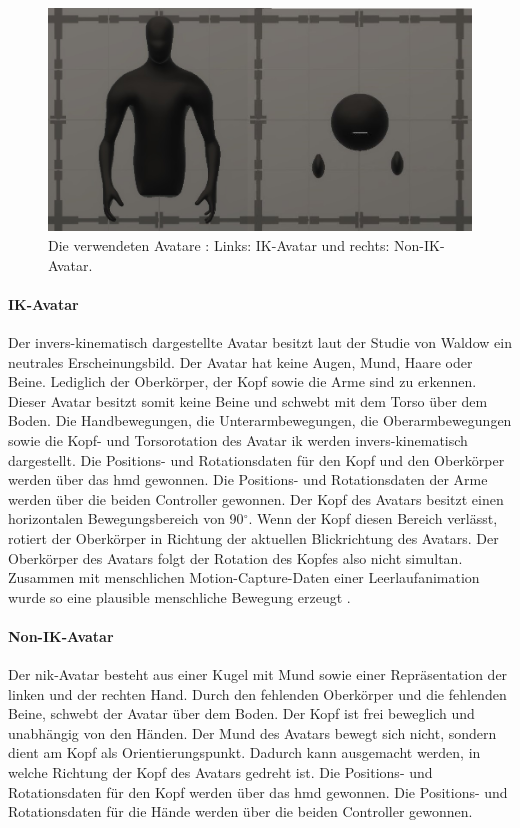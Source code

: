 \documentclass[a4paper,11pt]{article}%
\renewcommand{\\}{\vspace*{0.5\baselineskip} \newline}
\begin{document}
	\begin{figure}[H]
		\begin{footnotesize}
		\centering
			\includegraphics[width=\textwidth]{Abbildungen/Avatars.JPG}	
			\caption[Die verwendeten Avatare]{Die verwendeten Avatare : Links: IK-Avatar und rechts: Non-IK-Avatar.}
			\label{AvatareAussehen}
		\end{footnotesize}
	\end{figure}
	
		\paragraph{IK-Avatar}
Der invers-kinematisch dargestellte Avatar besitzt laut der Studie von Waldow \citep[S. 251]{waldow2019investigating} ein neutrales Erscheinungsbild. Der Avatar hat keine Augen, Mund, Haare oder Beine. Lediglich der Oberkörper, der Kopf sowie die Arme sind zu erkennen. Dieser Avatar besitzt somit keine Beine und schwebt mit dem Torso über dem Boden.
Die Handbewegungen, die Unterarmbewegungen, die Oberarmbewegungen sowie die Kopf- und Torsorotation des Avatar \ac{ik} werden invers-kinematisch dargestellt. Die Positions- und Rotationsdaten für den Kopf und den Oberkörper werden über das \ac{hmd} gewonnen. Die Positions- und Rotationsdaten der Arme werden über die beiden Controller gewonnen. Der Kopf des Avatars besitzt einen horizontalen Bewegungsbereich von 90$^\circ$. Wenn der Kopf diesen Bereich verlässt, rotiert der Oberkörper in Richtung der aktuellen Blickrichtung des Avatars. Der Oberkörper des Avatars folgt der Rotation des Kopfes also nicht simultan. Zusammen mit menschlichen Motion-Capture-Daten einer Leerlaufanimation wurde so eine plausible menschliche Bewegung erzeugt \citep[S. 251]{waldow2019investigating}.

		\paragraph{Non-IK-Avatar}
Der \ac{nik}-Avatar besteht aus einer Kugel mit Mund sowie einer Repräsentation der linken und der rechten Hand. Durch den fehlenden Oberkörper und die fehlenden Beine, schwebt der Avatar über dem Boden. Der Kopf ist frei beweglich und unabhängig von den Händen. Der Mund des Avatars bewegt sich nicht, sondern dient am Kopf als Orientierungspunkt. Dadurch kann ausgemacht werden, in welche Richtung der Kopf des Avatars gedreht ist. Die Positions- und Rotationsdaten für den Kopf werden über das \ac{hmd} gewonnen. Die Positions- und Rotationsdaten für die Hände werden über die beiden Controller gewonnen.
\end{document}
